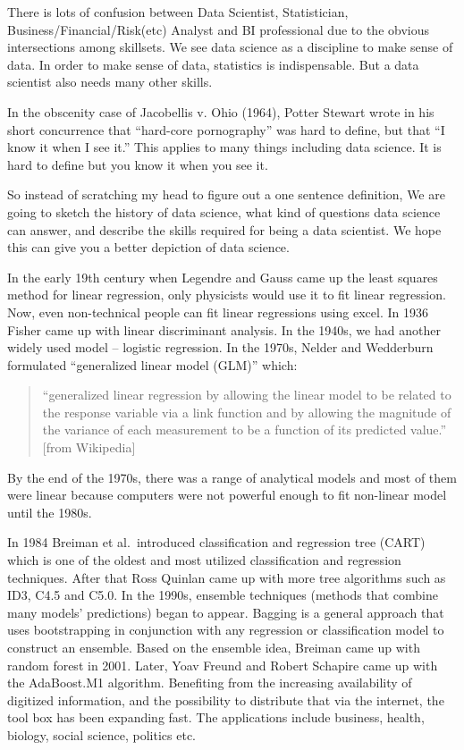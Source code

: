 \documentclass[
]{article}
\begin{document}
There is lots of confusion between Data Scientist, Statistician,
Business/Financial/Risk(etc) Analyst and BI professional due to the
obvious intersections among skillsets. We see data science as a
discipline to make sense of data. In order to make sense of data,
statistics is indispensable. But a data scientist also needs many other
skills.

In the obscenity case of Jacobellis v. Ohio (1964), Potter Stewart wrote
in his short concurrence that ``hard-core pornography'' was hard to
define, but that ``I know it when I see it.'' This applies to many
things including data science. It is hard to define but you know it when
you see it.

So instead of scratching my head to figure out a one sentence
definition, We are going to sketch the history of data science, what
kind of questions data science can answer, and describe the skills
required for being a data scientist. We hope this can give you a better
depiction of data science.

In the early 19th century when Legendre and Gauss came up the least
squares method for linear regression, only physicists would use it to
fit linear regression. Now, even non-technical people can fit linear
regressions using excel. In 1936 Fisher came up with linear discriminant
analysis. In the 1940s, we had another widely used model -- logistic
regression. In the 1970s, Nelder and Wedderburn formulated ``generalized
linear model (GLM)'' which:

\begin{quote}
``generalized linear regression by allowing the linear model to be
related to the response variable via a link function and by allowing the
magnitude of the variance of each measurement to be a function of its
predicted value.'' {[}from Wikipedia{]}
\end{quote}

By the end of the 1970s, there was a range of analytical models and most
of them were linear because computers were not powerful enough to fit
non-linear model until the 1980s.

In 1984 Breiman et al.~introduced classification and regression tree
(CART) which is one of the oldest and most utilized classification and
regression techniques. After that Ross Quinlan came up with more tree
algorithms such as ID3, C4.5 and C5.0. In the 1990s, ensemble techniques
(methods that combine many models' predictions) began to appear. Bagging
is a general approach that uses bootstrapping in conjunction with any
regression or classification model to construct an ensemble. Based on
the ensemble idea, Breiman came up with random forest in 2001. Later,
Yoav Freund and Robert Schapire came up with the AdaBoost.M1 algorithm.
Benefiting from the increasing availability of digitized information,
and the possibility to distribute that via the internet, the tool box
has been expanding fast. The applications include business, health,
biology, social science, politics etc.
\end{document}
